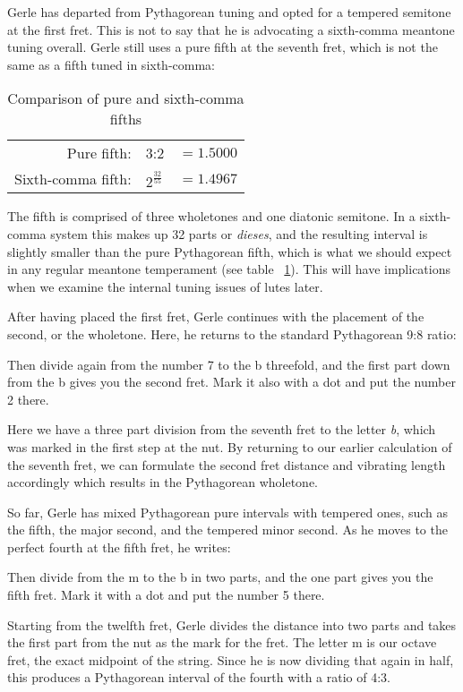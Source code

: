 Gerle has departed from Pythagorean tuning and opted for a tempered semitone at the first
fret. This is not to say that he is advocating a sixth-comma meantone tuning overall.
Gerle still uses a pure fifth at the seventh fret, which is not the same as a
fifth tuned in sixth-comma:
\begin{table}[h!]
  \begin{center}
  \begin{tabular}{ r l l }
    Pure fifth:    & 3:2         & $ = 1.5000 $ \\
    Sixth-comma fifth: & $ 2^\frac{32}{55} $ & $ = 1.4967 $ \\
  \end{tabular}
  \end{center}
  \caption{Comparison of pure and sixth-comma fifths}
  \label{table:6fifths}
\end{table}
The fifth is comprised of three wholetones and one diatonic semitone. In a sixth-comma
system this makes up 32 parts or \textit{dieses}, and the resulting interval is slightly smaller
than the pure Pythagorean fifth, which is what we should expect in any regular meantone
temperament (see table ~\ref{table:6fifths}). This will have implications when we examine
the internal tuning issues of lutes later.

After having placed the first fret, Gerle continues with the placement of the second, or the wholetone.
Here, he returns to the standard Pythagorean 9:8 ratio:
\begin{blocks}
Then divide again from the number 7 to the b threefold, and the first part down
from the b gives you the second fret. Mark it also with a dot and put the
number 2 there.
\end{blocks}
Here we have a three part division from the seventh fret to the letter \textit{b}, 
which was marked in the first step at the nut.
By returning to our earlier calculation of the seventh fret, we can formulate the
second fret distance and vibrating length accordingly which results in the Pythagorean
wholetone.

So far, Gerle has mixed Pythagorean pure intervals with tempered ones, such as
the fifth, the major second, and the tempered minor second. As he moves to the
perfect fourth at the fifth fret, he writes:
\begin{blocks}
Then divide from the m to the b in two parts, and the one part gives you the
fifth fret. Mark it with a dot and put the number 5 there.
\end{blocks}
Starting from the twelfth fret, Gerle divides the distance into two parts and takes the
first part from the nut as the mark for the fret. The letter m is our octave fret, the
exact midpoint of the string. Since he is now dividing that again in half, this
produces a Pythagorean interval of the fourth with a ratio of 4:3.

